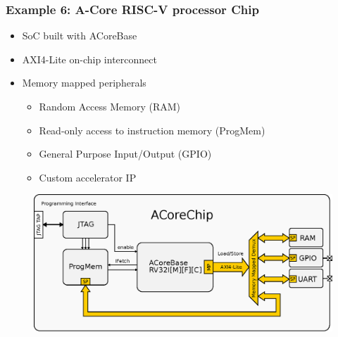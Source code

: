 \documentclass{sdkslides}
\begin{document}
\begin{frame}[c]
    \frametitle{Example 6: A-Core RISC-V processor Chip}
    \begin{itemize}
        \item SoC built with ACoreBase
        \item AXI4-Lite on-chip interconnect
        \item Memory mapped peripherals
            \begin{itemize}
                \item Random Access Memory (RAM)
                \item Read-only access to instruction memory (ProgMem)
                \item General Purpose Input/Output (GPIO)
                \item Custom accelerator IP
            \end{itemize}
    \end{itemize}
    \begin{figure}
        \centering
        \includegraphics[width=.8\textwidth]{./Pics/acorechip.eps}
        \label{fig:acorechip}
    \end{figure}
\end{frame}
\end{document}
